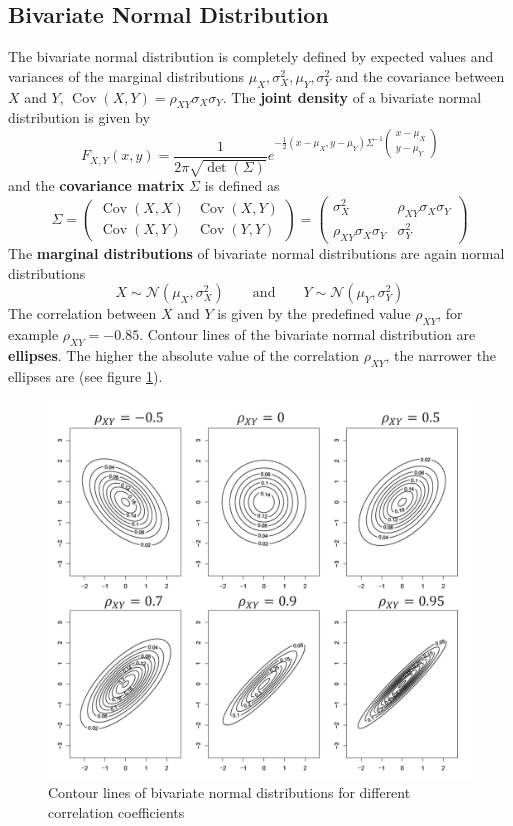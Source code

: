 \documentclass[11pt]{article}
\newcommand*\N[1]{\mathcal{N}\left(#1\right)}
\newcommand*\Cov[1]{\mathop{\text{Cov}}\left(#1\right)}
\begin{document}
\subsection{Bivariate Normal Distribution}
The bivariate normal distribution is completely defined by expected values and variances of the marginal distributions $\mu_X, \sigma_X^2, \mu_Y, \sigma_Y^2$ and the covariance between $X$ and $Y$, $\Cov{X,Y} = \rho_{XY}\sigma_X\sigma_Y$. The \textbf{joint density} of a bivariate normal distribution is given by
\begin{equation*}
	F_{X,Y}(x,y) = \frac{1}{2\pi\sqrt{\det(\Sigma)}} e^{-\frac{1}{2} (x-\mu_X, y-\mu_Y) \Sigma^{-1}\begin{pmatrix}
		x-\mu_X\\
		y-\mu_Y
		\end{pmatrix} }
\end{equation*}
and the \textbf{covariance matrix} $\Sigma$ is defined as
\begin{equation*}
	\Sigma = \begin{pmatrix}
	\Cov{X,X} & \Cov{X,Y}\\
	\Cov{X,Y} & \Cov{Y,Y}
	\end{pmatrix}
	=
	\begin{pmatrix}
		\sigma_X^2 & \rho_{XY}\sigma_X\sigma_Y\\
		\rho_{XY}\sigma_X\sigma_Y & \sigma_Y^2
	\end{pmatrix}
\end{equation*}
The \textbf{marginal distributions} of bivariate normal distributions are again normal distributions
\begin{equation*}
	X\sim\N{\mu_X,\sigma_X^2}\qquad\text{and}\qquad Y\sim\N{\mu_Y,\sigma_Y^2}
\end{equation*}
The correlation between $X$ and $Y$ is given by the predefined value $\rho_{XY}$, for example $\rho_{XY} = -0.85$. Contour lines of the bivariate normal distribution are \textbf{ellipses}. The higher the absolute value of the correlation $\rho_{XY}$, the narrower the ellipses are (see figure \ref{fig:correlationcontourlines}).

\begin{figure}[tbh]
	\centering
	\includegraphics[width=0.6\linewidth]{img/correlation_contour_lines}
	\caption{Contour lines of bivariate normal distributions for different correlation coefficients}
	\label{fig:correlationcontourlines}
\end{figure}
\end{document}
